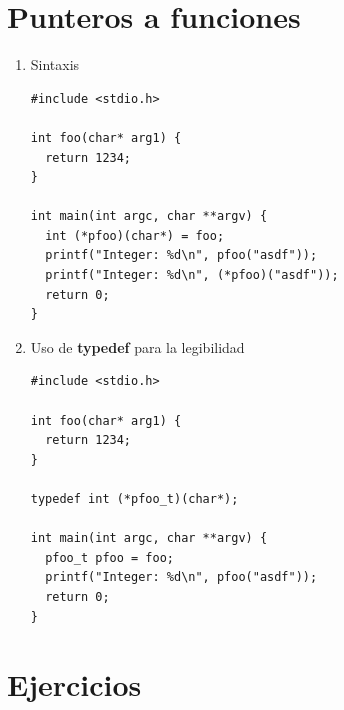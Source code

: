 \documentclass[a4paper,oneside]{article}
\begin{document}
\newpage
\section{Punteros a funciones}

  \begin{enumerate}
  
  \item Sintaxis

  \begin{verbatim}
#include <stdio.h>

int foo(char* arg1) {
  return 1234;
}

int main(int argc, char **argv) {
  int (*pfoo)(char*) = foo;
  printf("Integer: %d\n", pfoo("asdf"));
  printf("Integer: %d\n", (*pfoo)("asdf"));
  return 0;
}
  \end{verbatim}
  
  \item Uso de \textbf{typedef} para la legibilidad

  \begin{verbatim}
#include <stdio.h>

int foo(char* arg1) {
  return 1234;
}

typedef int (*pfoo_t)(char*);

int main(int argc, char **argv) {
  pfoo_t pfoo = foo;
  printf("Integer: %d\n", pfoo("asdf"));
  return 0;
}
  \end{verbatim}

  \end{enumerate}


\section{Ejercicios}
\end{document}
